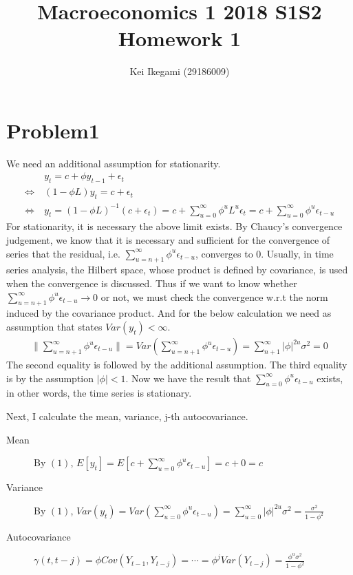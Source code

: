 \documentclass{article}
\begin{document}
\title{Macroeconomics 1 2018 S1S2 \\ 
Homework 1}
\author{Kei Ikegami (29186009)}
\maketitle

\section{Problem1}
 We need an additional assumption for stationarity.
 \begin{align}
 	&y_t = c + \phi y_{t-1} + \epsilon_t \nonumber \\
	\Leftrightarrow\ &(1-\phi L)y_t = c + \epsilon_t \nonumber \\
	\Leftrightarrow\ & y_t = (1-\phi L)^{-1} (c + \epsilon_t) = c + \sum_{u = 0}^{\infty} \phi^u L^u \epsilon_t = c + \sum_{u = 0}^{\infty} \phi^u \epsilon_{t-u}
 \end{align}
 For stationarity, it is necessary the above limit exists.  By Chaucy's convergence judgement, we know that it is necessary and sufficient for the convergence of series that the residual, i.e. $\sum_{u = n+1}^{\infty} \phi^u \epsilon_{t-u}$, converges to $0$. Usually, in time series analysis, the Hilbert space, whose product is defined by covariance, is used when the convergence is discussed. Thus if we want to know whether $\sum_{u = n+1}^{\infty} \phi^u \epsilon_{t-u} \to 0$ or not, we must check the convergence w.r.t the norm induced by the covariance product. And for the below calculation we need as assumption that states $Var(y_t) < \infty$. 
\begin{align*}
	\| \sum_{u = n+1}^{\infty} \phi^u \epsilon_{t-u} \| = Var(\sum_{u = n+1}^{\infty} \phi^u \epsilon_{t-u}) = \sum_{n+1}^{\infty} |\phi|^{2u}\sigma^2 = 0
\end{align*}
The second equality is followed by the additional assumption. The third equality is by the assumption $|\phi| < 1$. Now we have the result that $\sum_{u = 0}^{\infty} \phi^u \epsilon_{t-u}$ exists, in other words, the time series is stationary.

Next, I calculate the mean, variance, j-th autocovariance.
\begin{description}
	\item[Mean] By $(1)$, $E[y_t] = E\left[ c + \sum_{u = 0}^{\infty} \phi^u \epsilon_{t-u} \right] = c + 0 = c$
	\item[Variance] By $(1)$, $Var(y_t) = Var\left( \sum_{u = 0}^{\infty} \phi^u \epsilon_{t-u} \right) = \sum_{u=0}^{\infty} |\phi|^{2u} \sigma^2 = \frac{\sigma^2}{1-\phi^2}$
	\item[Autocovariance] $\gamma(t,t-j) = \phi Cov(Y_{t-1}, Y_{t-j}) = \cdots = \phi^j Var(Y_{t-j}) = \frac{\phi^u \sigma^2}{1-\phi^2}$
\end{description}
\end{document}

